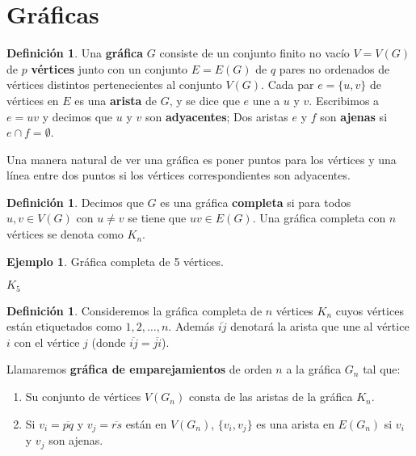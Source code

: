 \documentclass[12pt]{book}
\theoremstyle{definition}
\newtheorem{definition}[theorem]{Definición}
\newtheorem{example}[theorem]{Ejemplo}
\newcounter{in}
\newcounter{ini}
\begin{document}
\section{Gráficas}
\label{graficas}

\begin{definition}
  Una \textbf{gráfica} $G$ consiste de un conjunto finito no vacío $V=V(G)$
  de $p$ \textbf{vértices} junto con un conjunto $E=E(G)$ de $q$ pares no
  ordenados de vértices distintos pertenecientes al conjunto $V(G)$. Cada par $e=\{u,v\}$ de vértices
  en $E$ es una \textbf{arista} de $G$, y se dice que $e$ une a $u$ y
  $v$. Escribimos a $e=uv$ y decimos que $u$ y $v$ son \textbf{adyacentes};
  Dos aristas $e$ y $f$ son \textbf{ajenas} si $e\cap f=\emptyset$.
\end{definition}

Una manera natural de ver una gráfica es poner puntos para los
vértices y una línea entre dos puntos si los vértices correspondientes
son adyacentes.
\begin{definition}
  Decimos que $G$ es una gráfica \textbf{completa} si para
  todos~$u,v\in V(G)$ con $u\neq v$ se tiene que $uv\in E(G)$. Una gráfica completa con
  $n$ vértices se denota como $K_{n}$.
\end{definition}
\begin{example}
  Gráfica completa de 5 vértices.
  \bigskip

  \begin{minipage}{1.0\linewidth}
    \centering
  
    $K_{5}$
  \end{minipage}
  \label{fig:K5}
\end{example}

\begin{definition}
  \label{graf-emparejamientos}
  Consideremos la gráfica completa de $n$ vértices $K_{n}$ cuyos
  vértices están etiquetados como $1,2,\ldots,n$. Además
  $\overline{ij}$ denotará la arista que une al vértice $i$ con el
  vértice $j$ (donde $\overline{ij}=\overline{ji}$).
  
  Llamaremos \textbf{gráfica de emparejamientos} de orden $n$ a la
  gráfica $G_{n}$ tal que:
  
  \begin{enumerate}
  \item Su conjunto de vértices $V(G_{n})$ consta de las aristas de la gráfica
    $K_{n}$. 
  \item Si $v_{i}=\overline{pq}$ y $v_{j}=\overline{rs}$ están en
    $V(G_{n})$, $\{v_{i},v_{j}\}$ es una arista en $E(G_{n})$ si $v_{i}$
    y $v_{j}$ son ajenas.
  \end{enumerate}
\end{definition} 
\end{document}
